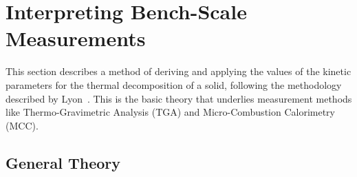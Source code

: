 \documentclass[11pt]{book}
\begin{document}
\section{Interpreting Bench-Scale Measurements}
\label{solid_kinetics}

This section describes a method of deriving and applying the values of the kinetic parameters for the thermal decomposition of a solid, following the methodology described by Lyon~\cite{Lyon:FM2000}. This is the basic theory that underlies measurement methods like Thermo-Gravimetric Analysis (TGA) and Micro-Combustion Calorimetry (MCC).


\subsection{General Theory}
\end{document}
